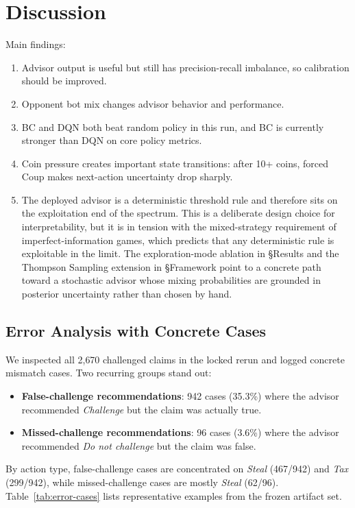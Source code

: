 \documentclass[11pt]{article}
\begin{document}
\section{Discussion}
Main findings:
\begin{enumerate}
  \item Advisor output is useful but still has precision-recall imbalance, so calibration should be improved.
  \item Opponent bot mix changes advisor behavior and performance.
  \item BC and DQN both beat random policy in this run, and BC is currently stronger than DQN on core policy metrics.
  \item Coin pressure creates important state transitions: after 10+ coins, forced Coup makes next-action uncertainty drop sharply.
  \item The deployed advisor is a deterministic threshold rule and therefore sits on the
  exploitation end of the spectrum. This is a deliberate design choice for interpretability, but it is in tension with the mixed-strategy requirement of imperfect-information games, which predicts that any deterministic rule is exploitable in the limit. The exploration-mode ablation in §Results and the Thompson Sampling extension in §Framework
  point to a concrete path toward a stochastic advisor whose mixing probabilities are grounded in posterior uncertainty rather than chosen by hand.
\end{enumerate}

\subsection{Error Analysis with Concrete Cases}
We inspected all 2{,}670 challenged claims in the locked rerun and logged concrete mismatch cases. Two recurring groups stand out:
\begin{itemize}
  \item \textbf{False-challenge recommendations}: 942 cases (35.3\%) where the advisor recommended \textit{Challenge} but the claim was actually true.
  \item \textbf{Missed-challenge recommendations}: 96 cases (3.6\%) where the advisor recommended \textit{Do not challenge} but the claim was false.
\end{itemize}

By action type, false-challenge cases are concentrated on \textit{Steal} (467/942) and \textit{Tax} (299/942), while missed-challenge cases are mostly \textit{Steal} (62/96). Table~\ref{tab:error-cases} lists representative examples from the frozen artifact set.
\end{document}
